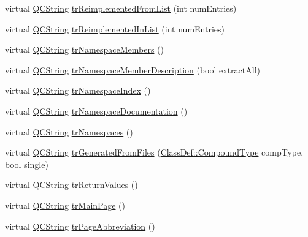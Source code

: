 \begin{DoxyCompactItemize}
\item 
virtual \mbox{\hyperlink{class_q_c_string}{Q\+C\+String}} \mbox{\hyperlink{class_translator_serbian_cyrillic_a3b5b178ee91fdb6453c37adf68b8f329}{tr\+Reimplemented\+From\+List}} (int num\+Entries)
\item 
virtual \mbox{\hyperlink{class_q_c_string}{Q\+C\+String}} \mbox{\hyperlink{class_translator_serbian_cyrillic_aa81e6f588e7cdf62347c04b0979aa889}{tr\+Reimplemented\+In\+List}} (int num\+Entries)
\item 
virtual \mbox{\hyperlink{class_q_c_string}{Q\+C\+String}} \mbox{\hyperlink{class_translator_serbian_cyrillic_aed41f07384469cb088f6c89ccb5822c5}{tr\+Namespace\+Members}} ()
\item 
virtual \mbox{\hyperlink{class_q_c_string}{Q\+C\+String}} \mbox{\hyperlink{class_translator_serbian_cyrillic_ae8413d6ec3c8802e09cd14bf254a2f3a}{tr\+Namespace\+Member\+Description}} (bool extract\+All)
\item 
virtual \mbox{\hyperlink{class_q_c_string}{Q\+C\+String}} \mbox{\hyperlink{class_translator_serbian_cyrillic_a9369007351adee7d2b0b4e489c2e192c}{tr\+Namespace\+Index}} ()
\item 
virtual \mbox{\hyperlink{class_q_c_string}{Q\+C\+String}} \mbox{\hyperlink{class_translator_serbian_cyrillic_a63a41233fd8d4e57d2b4342321daca09}{tr\+Namespace\+Documentation}} ()
\item 
virtual \mbox{\hyperlink{class_q_c_string}{Q\+C\+String}} \mbox{\hyperlink{class_translator_serbian_cyrillic_ac403f97448f90c24fdd0368f356c58a8}{tr\+Namespaces}} ()
\item 
virtual \mbox{\hyperlink{class_q_c_string}{Q\+C\+String}} \mbox{\hyperlink{class_translator_serbian_cyrillic_a2f4c3c830e8c6b1e025b5a968bfa505c}{tr\+Generated\+From\+Files}} (\mbox{\hyperlink{class_class_def_ae70cf86d35fe954a94c566fbcfc87939}{Class\+Def\+::\+Compound\+Type}} comp\+Type, bool single)
\item 
virtual \mbox{\hyperlink{class_q_c_string}{Q\+C\+String}} \mbox{\hyperlink{class_translator_serbian_cyrillic_a8a9b220f27ae1c967f43ff8716eeff03}{tr\+Return\+Values}} ()
\item 
virtual \mbox{\hyperlink{class_q_c_string}{Q\+C\+String}} \mbox{\hyperlink{class_translator_serbian_cyrillic_a3575c3499807135ec439529feaaf319e}{tr\+Main\+Page}} ()
\item 
virtual \mbox{\hyperlink{class_q_c_string}{Q\+C\+String}} \mbox{\hyperlink{class_translator_serbian_cyrillic_ab4fa3b34300ff2dd5b562548f2bf50ea}{tr\+Page\+Abbreviation}} ()
\item 

\end{DoxyCompactItemize}
